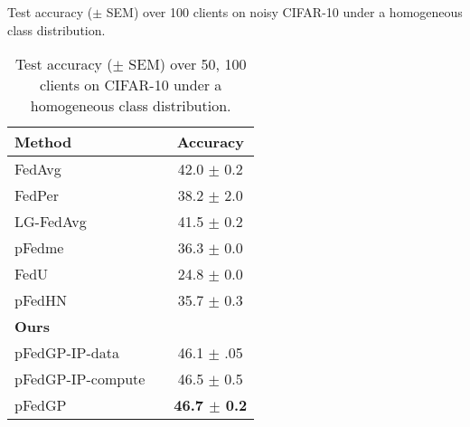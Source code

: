 \documentclass{article}
\begin{document}
\begin{table}[!t]
\parbox{.45\linewidth}{
\setlength{\tabcolsep}{3pt}
\small
\caption{Test accuracy ($\pm$ SEM) over 100 clients on noisy CIFAR-10 under a homogeneous class distribution.}
\vskip 0.15in
\centering
\begin{tabular}{l c c} 
    \toprule
    \multicolumn{1}{l}{Method} && \multicolumn{1}{c}{Accuracy}\\
    \midrule
    FedAvg \cite{mcmahan2017communication} && 42.0 $\pm$ 0.2 \\
    \midrule
    FedPer \cite{arivazhagan2019federated} && 38.2 $\pm$ 2.0 \\
    LG-FedAvg \cite{liang2020think} && 41.5 $\pm$ 0.2 \\
    pFedme \cite{t2020personalized} && 36.3 $\pm$ 0.0 \\
    FedU  \cite{dinh2021fedu} && 24.8 $\pm$ 0.0 \\
    pFedHN \cite{shamsian2021personalized_icml} && 35.7 $\pm$ 0.3 \\
    \midrule
    \textbf{Ours} &&\\
    pFedGP-IP-data && 46.1 $\pm$ .05 \\
    pFedGP-IP-compute && 46.5 $\pm$ 0.5 \\
    pFedGP && \textbf{46.7 $\pm$ 0.2} \\
    \bottomrule
\end{tabular}
\label{tab:noisy_cifar10}
}
\hfill
\parbox{.45\linewidth}{
\setlength{\tabcolsep}{3pt}
\caption{Test accuracy ($\pm$ SEM) over 50, 100 clients on CIFAR-10 under a homogeneous class distribution.}
\vskip 0.15in
\centering
{}
\label{tab:cifar10_10classes}
}
\end{table}
\end{document}
